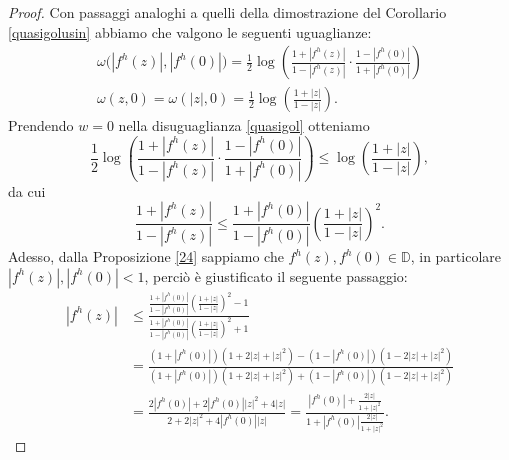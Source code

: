 \begin{proof}
  Con passaggi analoghi a quelli della dimostrazione del Corollario \ref{quasigolusin} abbiamo che valgono le seguenti uguaglianze:
  \begin{gather*}
    \omega\bigl(|f^h(z)|,|f^h(0)|\bigr)=\frac{1}{2}\log\left(\frac{1+|f^h(z)|}{1-|f^h(z)|}\cdot\frac{1-|f^h(0)|}{1+|f^h(0)|}\right)\\
    \omega(z, 0)=\omega(|z|,0)=\frac{1}{2}\log\left(\frac{1+|z|}{1-|z|}\right).
  \end{gather*}
  Prendendo $w=0$ nella disuguaglianza \eqref{quasigol} otteniamo
  $$\frac{1}{2}\log\left(\frac{1+|f^h(z)|}{1-|f^h(z)|}\cdot\frac{1-|f^h(0)|}{1+|f^h(0)|}\right) \le \log\left(\frac{1+|z|}{1-|z|}\right),$$
  da cui
  \begin{equation}
    \frac{1+|f^h(z)|}{1-|f^h(z)|} \le \frac{1+|f^h(0)|}{1-|f^h(0)|}\left(\frac{1+|z|}{1-|z|}\right)^2. \label{golprimo}
  \end{equation}
  Adesso, dalla Proposizione \ref{24} sappiamo che $f^h(z),f^h(0) \in \mathbb{D}$, in particolare $|f^h(z)|,|f^h(0)|<1$, perciò è giustificato il seguente passaggio:
  \begin{align*}
    |f^h(z)| & \le \frac{\frac{1+|f^h(0)|}{1-|f^h(0)|}\left(\frac{1+|z|}{1-|z|}\right)^2-1}{\frac{1+|f^h(0)|}{1-|f^h(0)|}\left(\frac{1+|z|}{1-|z|}\right)^2+1} \\
    & =\frac{(1+|f^h(0)|)(1+2|z|+|z|^2)-(1-|f^h(0)|)(1-2|z|+|z|^2)}{(1+|f^h(0)|)(1+2|z|+|z|^2)+(1-|f^h(0)|)(1-2|z|+|z|^2)} \\
    & =\frac{2|f^h(0)|+2|f^h(0)||z|^2+4|z|}{2+2|z|^2+4|f^h(0)||z|}=\frac{|f^h(0)|+\frac{2|z|}{1+|z|^2}}{1+|f^h(0)|\frac{2|z|}{1+|z|^2}}.
  \end{align*}
\end{proof}
